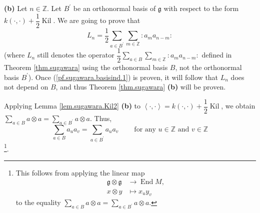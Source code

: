 \documentclass[etingof-lie.tex]{subfiles}
\begin{document}
\textbf{(b)} Let $n\in\mathbb{Z}$. Let $B^{\prime}$ be an orthonormal basis of
$\mathfrak{g}$ with respect to the form $k\left(  \cdot,\cdot\right)
+\dfrac{1}{2}\operatorname*{Kil}$. We are going to prove that%
\begin{equation}
L_{n}=\dfrac{1}{2}\sum\limits_{a\in B^{\prime}}\sum\limits_{m\in\mathbb{Z}%
}\left.  :a_{m}a_{n-m}:\right.  \label{pf.sugawara.basisind.1}%
\end{equation}
(where $L_{n}$ still denotes the operator $\dfrac{1}{2}\sum\limits_{a\in
B}\sum\limits_{m\in\mathbb{Z}}\left.  :a_{m}a_{n-m}:\right.  $ defined in
Theorem \ref{thm.sugawara} using the orthonormal basis $B$, not the
orthonormal basis $B^{\prime}$). Once (\ref{pf.sugawara.basisind.1}) is
proven, it will follow that $L_{n}$ does not depend on $B$, and thus Theorem
\ref{thm.sugawara} \textbf{(b)} will be proven.

Applying Lemma \ref{lem.sugawara.Kil2} \textbf{(b)} to $\left\langle
\cdot,\cdot\right\rangle =k\left(  \cdot,\cdot\right)  +\dfrac{1}%
{2}\operatorname*{Kil}$, we obtain $\sum\limits_{a\in B}a\otimes
a=\sum\limits_{a\in B^{\prime}}a\otimes a$. Thus,%
\begin{equation}
\sum\limits_{a\in B}a_{u}a_{v}=\sum\limits_{a\in B^{\prime}}a_{u}%
a_{v}\ \ \ \ \ \ \ \ \ \ \text{for any }u\in\mathbb{Z}\text{ and }%
v\in\mathbb{Z} \label{pf.sugawara.basisind.pf.1}%
\end{equation}
\footnote{This follows from applying the linear map
\begin{align*}
\mathfrak{g}\otimes\mathfrak{g}  &  \rightarrow\operatorname*{End}M,\\
x\otimes y  &  \mapsto x_{u}y_{v}%
\end{align*}
to the equality $\sum\limits_{a\in B}a\otimes a=\sum\limits_{a\in B^{\prime}%
}a\otimes a$.}.
\end{document}
